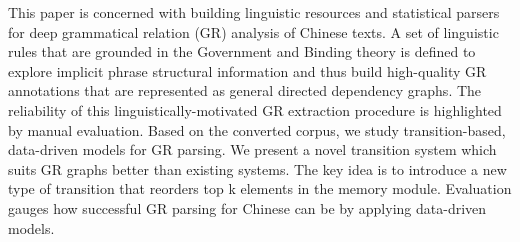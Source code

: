This paper is concerned with building linguistic resources and statistical parsers for deep grammatical relation (GR) analysis of Chinese texts. A set of linguistic rules that are grounded in the Government and Binding theory is defined to explore implicit phrase structural information and thus build high-quality GR annotations that are represented as general directed dependency graphs. The reliability of this linguistically-motivated GR extraction procedure is highlighted by manual evaluation. Based on the converted corpus, we study transition-based, data-driven models for GR parsing. We present a novel transition system which suits GR graphs better than existing systems. The key idea is to introduce a new type of transition that reorders top k elements in the memory module. Evaluation gauges how successful GR parsing for Chinese can be by applying data-driven models.
